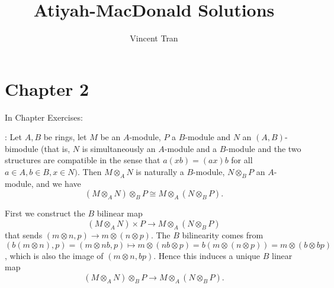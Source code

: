 \documentclass[a4paper]{exam}
\title{Atiyah-MacDonald Solutions}
\author{Vincent Tran}
\begin{document}
\maketitle

\section{Chapter 2}

In Chapter Exercises:

\begin{questions}

	: Let $A,B $ be rings, let $M$ be an $A$-module, $P$ a $B$-module and $N$ an $(A, B)$-bimodule (that is, $N$ is simultaneously an $A$-module and a $B$-module and the two structures are compatible in the sense that $a(xb) = (ax)b$ for all $a \in A, b\in B, x \in N)$. Then $M \otimes _A N$ is naturally a $B$-module, $N \otimes _B P$ an $A$-module, and we have
	\[
		(M \otimes _A N) \otimes _B P \cong M \otimes _A (N \otimes _B P)
	.\]
	\begin{solution}

		First we construct the $B $ bilinear map
		\[
			(M \otimes _A N) \times P \to M \otimes _A (N \otimes _B P)
		\]
		that sends $(m \otimes n, p) \to m \otimes (n \otimes p) $.
		The $B $ bilinearity comes from $(b(m \otimes n),p) = (m \otimes nb,p) \mapsto m \otimes (nb \otimes p) = b(m \otimes (n \otimes p)) = m \otimes (b \otimes bp) $, which is also the image of $(m \otimes n, bp) $.
		Hence this induces a unique $B $ linear map
		\[
			(M \otimes_A N) \otimes_B P \to M \otimes _A (N \otimes _B P)
		.\]


\end{solution}
\end{questions}
\end{document}
